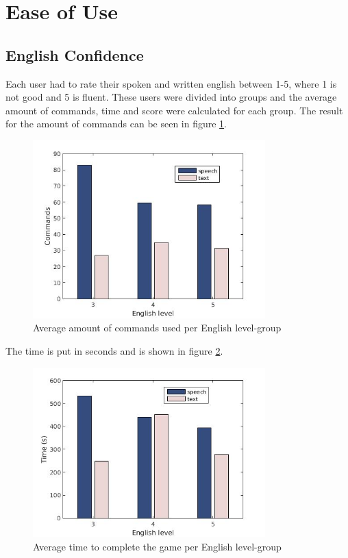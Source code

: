 \section{Ease of Use}

\subsection{English Confidence} \label{sec:eng_con}
Each user had to rate their spoken and written english between 1-5, where 1 is not good and 5 is fluent. These users were divided into groups and the average amount of commands, time and score were calculated for each group. The result for the amount of commands can be seen in figure \ref{eng_cmd}. 

\begin{figure}[ht]
  \centering
  \includegraphics[width=0.8\textwidth]{images/english_cmd.jpg}
  \caption{Average amount of commands used per English level-group}\label{eng_cmd}
\end{figure}

The time is put in seconds and is shown in figure \ref{eng_time}.

\begin{figure}[ht]
  \centering
  \includegraphics[width=0.8\textwidth]{images/english_time.jpg}
  \caption{Average time to complete the game per English level-group}\label{eng_time}
\end{figure}

